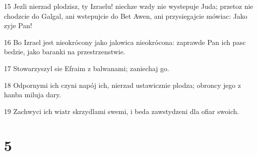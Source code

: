 \par 15 Jezli nierzad plodzisz, ty Izraelu! niechze wzdy nie wystepuje Juda; przetoz nie chodzcie do Galgal, ani wstepujcie do Bet Awen, ani przysiegajcie mówiac: Jako zyje Pan!
\par 16 Bo Izrael jest nieokrócony jako jalowica nieokrócona: zaprawde Pan ich pasc bedzie, jako baranki na przestrzenstwie.
\par 17 Stowarzyszyl sie Efraim z balwanami; zaniechaj go.
\par 18 Odpornymi ich czyni napój ich, nierzad ustawicznie plodza; obroncy jego z hanba miluja dary.
\par 19 Zachwyci ich wiatr skrzydlami swemi, i beda zawstydzeni dla ofiar swoich.

\chapter{5}

